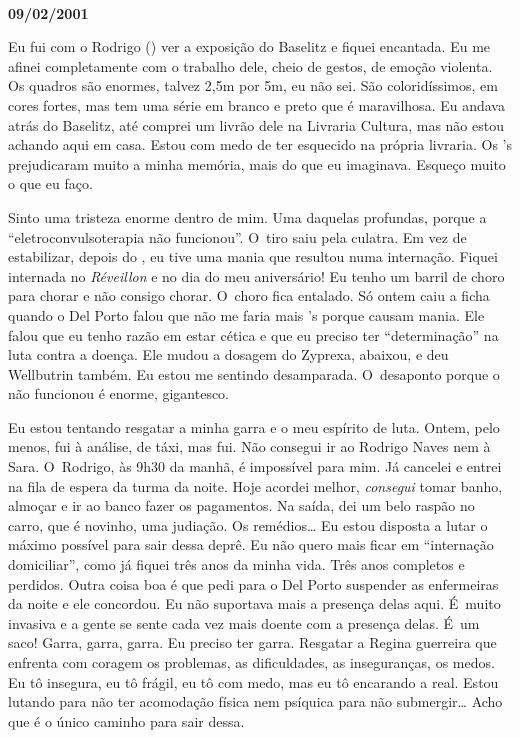 \begin{center}\asterisc{}​\end{center}


\begin{flushright}\textbf{09/02/2001}\end{flushright}


Eu fui com o Rodrigo () ver a exposição do Baselitz e fiquei
encantada. Eu me afinei completamente com o trabalho dele, cheio de
gestos, de emoção violenta. Os quadros são enormes, talvez 2,5m por 5m,
eu não sei. São coloridíssimos, em cores fortes, mas tem uma série em
branco e preto que é maravilhosa. Eu andava atrás do Baselitz, até
comprei um livrão dele na Livraria Cultura, mas não estou achando aqui
em casa. Estou com medo de ter esquecido na própria livraria. Os 's
prejudicaram muito a minha memória, mais do que eu imaginava. Esqueço
muito o que eu faço.

Sinto uma tristeza enorme dentro de mim. Uma daquelas profundas, porque
a ``eletroconvulsoterapia não funcionou''. O~tiro saiu pela culatra. Em
vez de estabilizar, depois do , eu tive uma mania que resultou numa
internação. Fiquei internada no \emph{Réveillon} e no dia do meu
aniversário! Eu tenho um barril de choro para chorar e não consigo
chorar. O~choro fica entalado. Só ontem caiu a ficha quando o Del Porto
falou que não me faria mais 's porque causam mania. Ele falou que eu
tenho razão em estar cética e que eu preciso ter ``determinação'' na
luta contra a doença. Ele mudou a dosagem do Zyprexa, abaixou, e deu
Wellbutrin  também. Eu estou me sentindo desamparada. O~desaponto
porque o  não funcionou é enorme, gigantesco.

Eu estou tentando resgatar a minha garra e o meu espírito de luta.
Ontem, pelo menos, fui à análise, de táxi, mas fui. Não consegui ir ao
Rodrigo Naves nem à Sara. O~Rodrigo, às 9h30 da manhã, é impossível para
mim. Já cancelei e entrei na fila de espera da turma da noite. Hoje
acordei melhor, \emph{consegui} tomar banho, almoçar e ir ao banco fazer
os pagamentos. Na saída, dei um belo raspão no carro, que é novinho, uma
judiação. Os remédios… Eu estou disposta a lutar o máximo
possível para sair dessa deprê. Eu não quero mais ficar em ``internação
domiciliar'', como já fiquei três anos da minha vida. Três anos
completos e perdidos. Outra coisa boa é que pedi para o Del Porto
suspender as enfermeiras da noite e ele concordou. Eu não suportava mais
a presença delas aqui. É~muito invasiva e a gente se sente cada vez mais
doente com a presença delas. É~um saco! Garra, garra, garra. Eu preciso
ter garra. Resgatar a Regina guerreira que enfrenta com coragem os
problemas, as dificuldades, as inseguranças, os medos. Eu tô insegura,
eu tô frágil, eu tô com medo, mas eu tô encarando a real. Estou lutando
para não ter acomodação física nem psíquica para não submergir…
Acho que é o único caminho para sair dessa.

